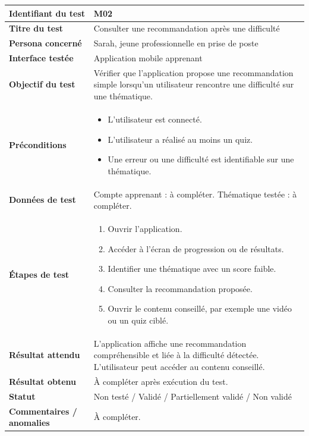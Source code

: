 \begin{longtable}{|p{4cm}|p{10cm}|}
\textbf{Identifiant du test} & M02 \\ \hline
\textbf{Titre du test} & Consulter une recommandation après une difficulté \\ \hline
\textbf{Persona concerné} & Sarah, jeune professionnelle en prise de poste \\ \hline
\textbf{Interface testée} & Application mobile apprenant \\ \hline
\textbf{Objectif du test} & Vérifier que l'application propose une recommandation simple lorsqu'un utilisateur rencontre une difficulté sur une thématique. \\ \hline
\textbf{Préconditions} &
\begin{itemize}
    \item L'utilisateur est connecté.
    \item L'utilisateur a réalisé au moins un quiz.
    \item Une erreur ou une difficulté est identifiable sur une thématique.
\end{itemize}
\\ \hline
\textbf{Données de test} & 
Compte apprenant : à compléter. \newline
Thématique testée : à compléter. \\ \hline
\textbf{Étapes de test} &
\begin{enumerate}
    \item Ouvrir l'application.
    \item Accéder à l'écran de progression ou de résultats.
    \item Identifier une thématique avec un score faible.
    \item Consulter la recommandation proposée.
    \item Ouvrir le contenu conseillé, par exemple une vidéo ou un quiz ciblé.
\end{enumerate}
\\ \hline
\textbf{Résultat attendu} & 
L'application affiche une recommandation compréhensible et liée à la difficulté détectée. L'utilisateur peut accéder au contenu conseillé. \\ \hline
\textbf{Résultat obtenu} & À compléter après exécution du test. \\ \hline
\textbf{Statut} & Non testé / Validé / Partiellement validé / Non validé \\ \hline
\textbf{Commentaires / anomalies} & À compléter. \\
\end{longtable}
\endgroup

